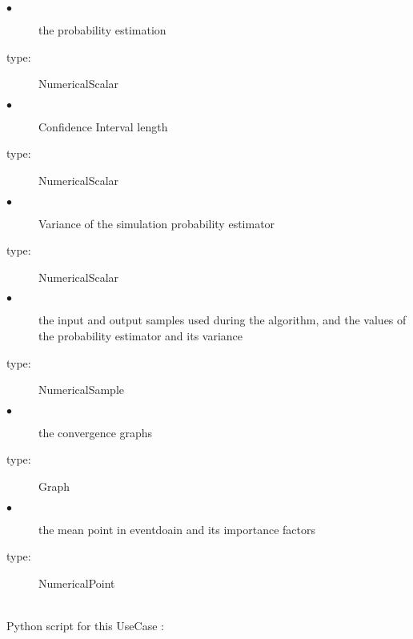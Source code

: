              {
               \begin{description}
               \item[$\bullet$] the  probability estimation
               \item[type:] NumericalScalar
               \item[$\bullet$] Confidence Interval length
               \item[type:] NumericalScalar
               \item[$\bullet$]  Variance of the simulation probability estimator
               \item[type:] NumericalScalar
               \item[$\bullet$]  the input and output samples used during the algorithm, and the values of the probability estimator and its variance
               \item[type:] NumericalSample
               \item[$\bullet$]  the convergence graphs
               \item[type:] Graph
               \item[$\bullet$]  the  mean point in eventdoain and its importance factors
               \item[type:] NumericalPoint
               \end{description}
             }

             \textspace\\
             Python  script for this UseCase :

